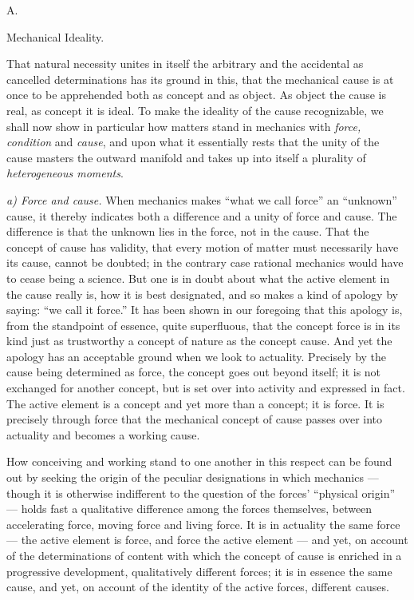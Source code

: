 \documentclass[12pt,a4paper]{book}
\newcommand{\afdeling}[2]{%
  \par\vspace{1.3\baselineskip}%
  {\centering #1\par\vspace{0.2\baselineskip}\normalsize #2\par}%
  \addcontentsline{toc}{section}{#1 #2}%
  \vspace{0.8\baselineskip}\par\nointerlineskip}
\newcommand{\runin}[1]{\emph{#1}\hspace{0.4em}}
\begin{document}
\afdeling{A.}{Mechanical Ideality.}

That natural necessity unites in itself the arbitrary and the accidental as cancelled
determinations has its ground in this, that the mechanical cause is at once to be
apprehended both as concept and as object. As object the cause is real, as concept it is
ideal. To make the ideality of the cause recognizable, we shall now show in particular how
matters stand in mechanics with
\emph{force, condition} and \emph{cause}, and upon what it essentially rests that the unity
of the cause masters the outward manifold and takes up into itself a plurality of
\emph{heterogeneous moments}.

\runin{a) Force and cause.} When mechanics makes ``what we call force'' an ``unknown''
cause, it thereby indicates both a difference and a unity of force and cause. The
difference is that the unknown lies in the force, not in the cause. That the concept of
cause has validity, that every motion of matter must necessarily have its cause, cannot be
doubted; in the contrary case rational mechanics would have to cease being a science. But
one is in doubt about what the active element in the cause really is, how
it is best designated, and so makes a kind of apology by saying: ``we call it force.'' It
has been shown in our foregoing that this apology is, from the standpoint of essence,
quite superfluous, that the concept force is in its kind just as trustworthy a concept of
nature as the concept cause. And yet the apology has an acceptable ground when we look to
actuality. Precisely by the cause being determined as force, the concept goes out beyond
itself; it is not exchanged for another concept, but is set over into activity and
expressed in fact. The active element is a concept and yet more than a concept; it is
force. It is precisely through force that the mechanical concept of cause passes over into
actuality and becomes a working cause.

How conceiving and working stand to one another in this respect can be found out by seeking
the origin of the peculiar designations in which mechanics --- though it is otherwise
indifferent to the question of the forces' ``physical origin'' --- holds fast a qualitative
difference among the forces themselves, between accelerating force, moving force and living
force. It is in actuality the same force --- the active element is force, and force the
active element --- and yet, on account of the determinations of content with which the
concept of cause is enriched in a progressive development, qualitatively different forces;
it is in essence the same cause, and yet, on account of the identity of the active forces,
different causes.
\end{document}

